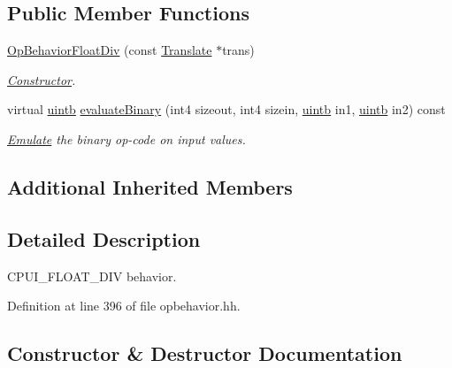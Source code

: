 \subsection*{Public Member Functions}
\begin{DoxyCompactItemize}
\item 
\mbox{\hyperlink{class_op_behavior_float_div_ac83406bf8ebcdbbba6091d1e086ca13f}{Op\+Behavior\+Float\+Div}} (const \mbox{\hyperlink{class_translate}{Translate}} $\ast$trans)
\begin{DoxyCompactList}\small\item\em \mbox{\hyperlink{class_constructor}{Constructor}}. \end{DoxyCompactList}\item 
virtual \mbox{\hyperlink{types_8h_a2db313c5d32a12b01d26ac9b3bca178f}{uintb}} \mbox{\hyperlink{class_op_behavior_float_div_a158c6ed93c6f39f5755746f0476bebce}{evaluate\+Binary}} (int4 sizeout, int4 sizein, \mbox{\hyperlink{types_8h_a2db313c5d32a12b01d26ac9b3bca178f}{uintb}} in1, \mbox{\hyperlink{types_8h_a2db313c5d32a12b01d26ac9b3bca178f}{uintb}} in2) const
\begin{DoxyCompactList}\small\item\em \mbox{\hyperlink{class_emulate}{Emulate}} the binary op-\/code on input values. \end{DoxyCompactList}\end{DoxyCompactItemize}
\subsection*{Additional Inherited Members}


\subsection{Detailed Description}
C\+P\+U\+I\+\_\+\+F\+L\+O\+A\+T\+\_\+\+D\+IV behavior. 

Definition at line 396 of file opbehavior.\+hh.



\subsection{Constructor \& Destructor Documentation}
\mbox{\label{class_op_behavior_float_div_ac83406bf8ebcdbbba6091d1e086ca13f}} 
